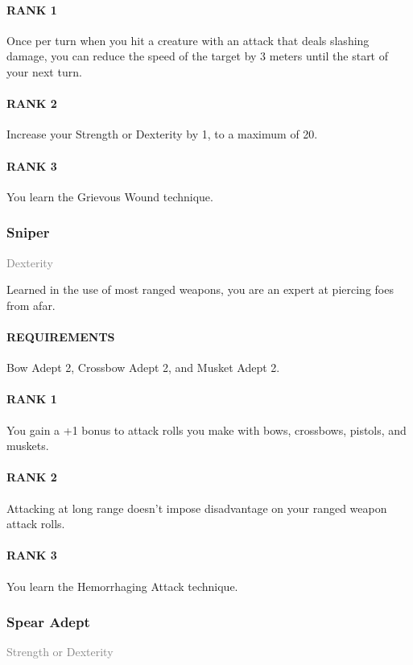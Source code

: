 \paragraph{RANK 1} Once per turn when you hit a creature with an attack that deals slashing damage, you can reduce the speed of the target by 3 meters until the start of your next turn.
\paragraph{RANK 2} Increase your Strength or Dexterity by 1, to a maximum of 20.
\paragraph{RANK 3} You learn the Grievous Wound technique.

\subsubsection{Sniper} \label{feat::sniper}
\small{\textcolor{gray}{Dexterity}}

\normalsize
Learned in the use of most ranged weapons, you are an expert at piercing foes from afar.
\paragraph{REQUIREMENTS} Bow Adept 2, Crossbow Adept 2, and Musket Adept 2.
\paragraph{RANK 1} You gain a +1 bonus to attack rolls you make with bows, crossbows, pistols, and muskets.
\paragraph{RANK 2} Attacking at long range doesn't impose disadvantage on your ranged weapon attack rolls.
\paragraph{RANK 3} You learn the Hemorrhaging Attack technique.

\subsubsection{Spear Adept} \label{feat::spearadept}
\small{\textcolor{gray}{Strength or Dexterity}}

